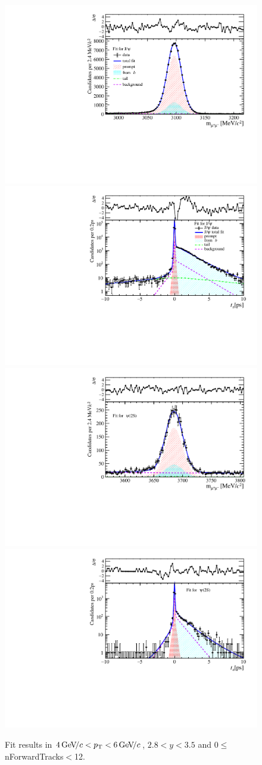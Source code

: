\begin{figure}[H]
\begin{center}
\includegraphics[width=0.47\linewidth]{pdf/Jpsi/drawmassF/n1y2pt3.pdf}
\includegraphics[width=0.47\linewidth]{pdf/Jpsi/2DFitF/n1y2pt3.pdf}
\vspace*{-0.5cm}
\includegraphics[width=0.47\linewidth]{pdf/Psi2S/drawmassF/n1y2pt3.pdf}
\includegraphics[width=0.47\linewidth]{pdf/Psi2S/2DFitF/n1y2pt3.pdf}
\vspace*{-0.5cm}
\end{center}
\caption{Fit results in $4\text{\,Ge\kern -0.1em V\!/}c<p_{\mathrm{T}}<6\text{\,Ge\kern -0.1em V\!/}c$, $2.8<y<3.5$ and 0$\leq$nForwardTracks$<$12.}
\label{Fitn1y2pt3}
\end{figure}
